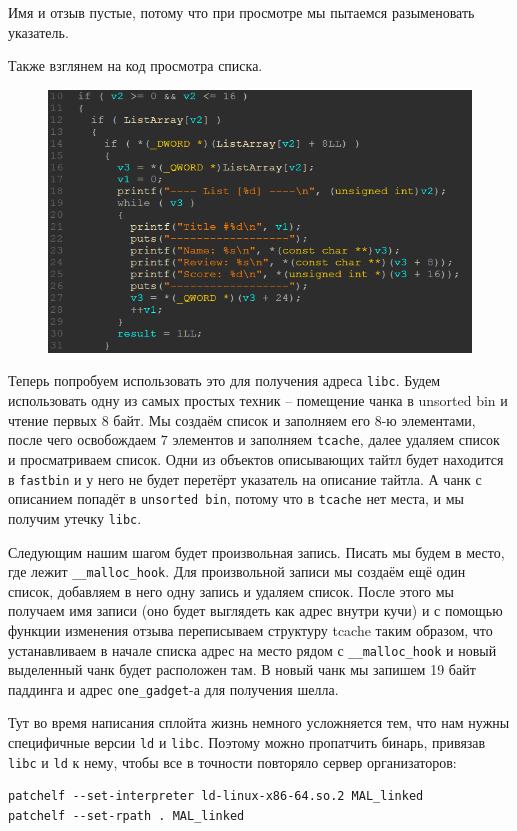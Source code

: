 \documentclass[idxtotoc,hyperref,openany,oneside]{files/pwn} %
\begin{document}
Имя и отзыв пустые, потому что при просмотре мы пытаемся разыменовать указатель.

Также взглянем на код просмотра списка.
\begin{figure}[H]
\begin{center}
\includegraphics[width=1.0\linewidth]{files/mal-empty-point}
\end{center}
\label{fig:mal-empty-point}
\end{figure}

Теперь попробуем использовать это для получения адреса \verb|libc|. Будем использовать одну из самых простых техник – помещение чанка в unsorted bin и чтение первых $8$ байт. Мы создаём список и заполняем его $8$-ю элементами, после чего освобождаем $7$ элементов и заполняем \verb|tcache|, далее удаляем список и просматриваем список. Одни из объектов описывающих тайтл будет находится в \verb|fastbin| и у него не будет перетёрт указатель на описание тайтла. А чанк с описанием попадёт в \verb|unsorted bin|, потому что в \verb|tcache| нет места, и мы получим утечку \verb|libc|.

Следующим нашим шагом будет произвольная запись. Писать мы будем в место, где лежит \verb|__malloc_hook|. Для произвольной записи мы создаём ещё один список, добавляем в него одну запись и удаляем список. После этого мы получаем имя записи (оно будет выглядеть как адрес внутри кучи) и с помощью функции изменения отзыва переписываем структуру tcache таким образом, что устанавливаем в начале списка адрес на место рядом с \verb|__malloc_hook| и новый выделенный чанк будет расположен там. В новый чанк мы запишем 19 байт паддинга и адрес \verb|one_gadget|-а для получения шелла.

Тут во время написания сплойта жизнь немного усложняется тем, что нам нужны специфичные версии \verb|ld| и \verb|libc|. Поэтому можно пропатчить бинарь, привязав \verb|libc| и \verb|ld| к нему, чтобы все в точности повторяло сервер организаторов:
\begin{verbatim}
patchelf --set-interpreter ld-linux-x86-64.so.2 MAL_linked
patchelf --set-rpath . MAL_linked
\end{verbatim}
\end{document}
